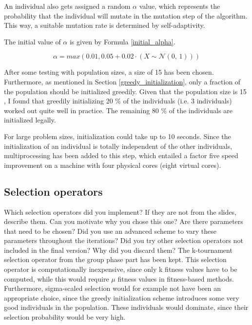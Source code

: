 \documentclass[a4paper,10pt]{article}
\newcommand{\ReplaceMe}[1]{{\color{blue}#1}}
\begin{document}
An individual also gets assigned a random $\alpha$ value, which represents the probability that the individual will mutate in the mutation step of the algorithm. This way, a suitable mutation rate is determined by self-adaptivity.

The initial value of $\alpha$ is given by Formula \ref{initial_alpha}.

\begin{equation}
    \label{initial_alpha}
    \alpha = max(0.01, 0.05+0.02 \cdot (X \sim \mathcal{N}(0,\,1)))
\end{equation}

After some testing with population sizes, a size of 15 %
has been chosen. Furthermore, as mentioned in Section \ref{greedy_initialization}, only a fraction of the population should be initialized greedily. Given that the  population size is 15 %
, I found that greedily initializing 20 \% of the individuals (i.e. 3 individuals) worked out quite well in practice. The remaining 80 \% of the individuals are initialized legally.

For large problem sizes, initialization could take up to 10 seconds. Since the initialization of an individual is totally independent of the other individuals, multiprocessing has been added to this step, which entailed a factor five speed improvement on a machine with four physical cores (eight virtual cores).


\subsection{Selection operators}
\label{selection}
\ReplaceMe{Which selection operators did you implement? If they are not from the slides, describe them. Can you motivate why you chose this one? Are there parameters that need to be chosen? Did you use an advanced scheme to vary these parameters throughout the iterations? Did you try other selection operators not included in the final version? Why did you discard them?}
The k-tournament selection operator from the group phase part has been kept. This selection operator is computationally inexpensive, since only k fitness values have to be computed, while this would require $\mu$ fitness values in fitness-based methods. Furthermore, sigma-scaled selection would for example not have been an appropriate choice, since the greedy initialization scheme introduces some very good individuals in the population. These individuals would dominate, since their selection probability would be very high.
\end{document}
